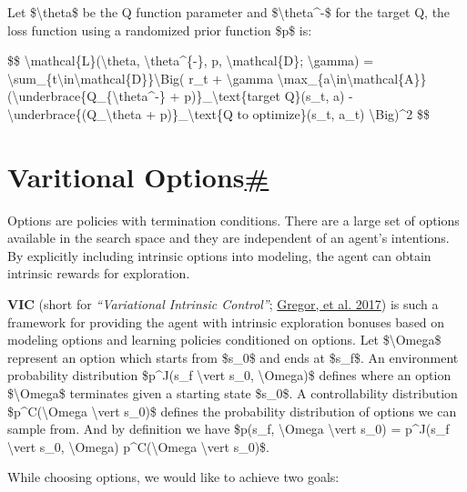 Let \$\textbackslash theta\$ be the Q function parameter and \$\textbackslash theta\^{}-\$ for the target Q, the loss function using a randomized prior function \$p\$ is:

\$\$ \textbackslash mathcal\{L\}(\textbackslash theta, \textbackslash theta\^{}\{-\}, p, \textbackslash mathcal\{D\}; \textbackslash gamma) = \textbackslash sum\_\{t\textbackslash in\textbackslash mathcal\{D\}\}\textbackslash Big( r\_t + \textbackslash gamma \textbackslash max\_\{a\textquotesingle\textbackslash in\textbackslash mathcal\{A\}\} (\textbackslash underbrace\{Q\_\{\textbackslash theta\^{}-\} + p)\}\_\textbackslash text\{target Q\}(s\textquotesingle\_t, a\textquotesingle) - \textbackslash underbrace\{(Q\_\textbackslash theta + p)\}\_\textbackslash text\{Q to optimize\}(s\_t, a\_t) \textbackslash Big)\^{}2 \$\$

\section{\texorpdfstring{Varitional Options\hyperref[varitional-options]{\#}}{Varitional Options\#}}\label{varitional-options}

Options are policies with termination conditions. There are a large set of options available in the search space and they are independent of an agent's intentions. By explicitly including intrinsic options into modeling, the agent can obtain intrinsic rewards for exploration.

\textbf{VIC} (short for \emph{``Variational Intrinsic Control''}; \href{https://arxiv.org/abs/1611.07507}{Gregor, et al. 2017}) is such a framework for providing the agent with intrinsic exploration bonuses based on modeling options and learning policies conditioned on options. Let \$\textbackslash Omega\$ represent an option which starts from \$s\_0\$ and ends at \$s\_f\$. An environment probability distribution \$p\^{}J(s\_f \textbackslash vert s\_0, \textbackslash Omega)\$ defines where an option \$\textbackslash Omega\$ terminates given a starting state \$s\_0\$. A controllability distribution \$p\^{}C(\textbackslash Omega \textbackslash vert s\_0)\$ defines the probability distribution of options we can sample from. And by definition we have \$p(s\_f, \textbackslash Omega \textbackslash vert s\_0) = p\^{}J(s\_f \textbackslash vert s\_0, \textbackslash Omega) p\^{}C(\textbackslash Omega \textbackslash vert s\_0)\$.

While choosing options, we would like to achieve two goals:

